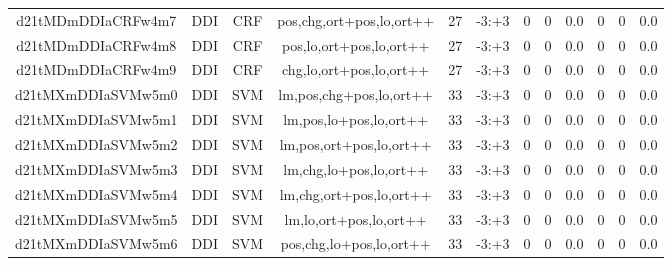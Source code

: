 \documentclass[a4paper]{article}
\begin{document}
\begin{landscape}
\begin{center}
\begin{tabular}{ |c|c|c|c|c|c|c|c|c|c|c|c|}
 
 	
 	\small{ d21tMDmDDIaCRFw4m7 } & \small{ DDI} & \small{  CRF }  & pos,chg,ort+pos,lo,ort++  &  27 &  \small{  -3:+3 }  &  0 & 0 & 0.0  &  0 & 0 & 0.0 \\
 	

 
 	
 	\small{ d21tMDmDDIaCRFw4m8 } & \small{ DDI} & \small{  CRF }  & pos,lo,ort+pos,lo,ort++  &  27 &  \small{  -3:+3 }  &  0 & 0 & 0.0  &  0 & 0 & 0.0 \\
 	

 
 	
 	\small{ d21tMDmDDIaCRFw4m9 } & \small{ DDI} & \small{  CRF }  & chg,lo,ort+pos,lo,ort++  &  27 &  \small{  -3:+3 }  &  0 & 0 & 0.0  &  0 & 0 & 0.0 \\
 	

 
 	
 	\small{ d21tMXmDDIaSVMw5m0 } & \small{ DDI} & \small{  SVM }  & lm,pos,chg+pos,lo,ort++  &  33 &  \small{  -3:+3 }  &  0 & 0 & 0.0  &  0 & 0 & 0.0 \\
 	

 
 	
 	\small{ d21tMXmDDIaSVMw5m1 } & \small{ DDI} & \small{  SVM }  & lm,pos,lo+pos,lo,ort++  &  33 &  \small{  -3:+3 }  &  0 & 0 & 0.0  &  0 & 0 & 0.0 \\
 	

 
 	
 	\small{ d21tMXmDDIaSVMw5m2 } & \small{ DDI} & \small{  SVM }  & lm,pos,ort+pos,lo,ort++  &  33 &  \small{  -3:+3 }  &  0 & 0 & 0.0  &  0 & 0 & 0.0 \\
 	

 
 	
 	\small{ d21tMXmDDIaSVMw5m3 } & \small{ DDI} & \small{  SVM }  & lm,chg,lo+pos,lo,ort++  &  33 &  \small{  -3:+3 }  &  0 & 0 & 0.0  &  0 & 0 & 0.0 \\
 	

 
 	
 	\small{ d21tMXmDDIaSVMw5m4 } & \small{ DDI} & \small{  SVM }  & lm,chg,ort+pos,lo,ort++  &  33 &  \small{  -3:+3 }  &  0 & 0 & 0.0  &  0 & 0 & 0.0 \\
 	

 
 	
 	\small{ d21tMXmDDIaSVMw5m5 } & \small{ DDI} & \small{  SVM }  & lm,lo,ort+pos,lo,ort++  &  33 &  \small{  -3:+3 }  &  0 & 0 & 0.0  &  0 & 0 & 0.0 \\
 	

 
 	
 	\small{ d21tMXmDDIaSVMw5m6 } & \small{ DDI} & \small{  SVM }  & pos,chg,lo+pos,lo,ort++  &  33 &  \small{  -3:+3 }  &  0 & 0 & 0.0  &  0 & 0 & 0.0 \\
 	


\end{tabular}
\end{center}
\end{landscape}
\end{document}
